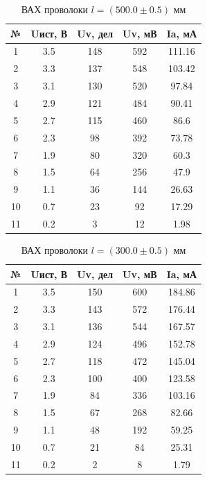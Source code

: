 \documentclass{article}
\begin{document}
	
	\begin{table}[H]
		\centering
		\begin{tabular}{|c|c|c|c|c|}
			\hline
			№ & Uист, В & Uv, дел & Uv, мВ & Ia, мА \\ \hline
			1 & 3.5 & 148 & 592 & 111.16 \\ \hline
			2 & 3.3 & 137 & 548 & 103.42 \\ \hline
			3 & 3.1 & 130 & 520 & 97.84 \\ \hline
			4 & 2.9 & 121 & 484 & 90.41 \\ \hline
			5 & 2.7 & 115 & 460 & 86.6 \\ \hline
			6 & 2.3 & 98 & 392 & 73.78 \\ \hline
			7 & 1.9 & 80 & 320 & 60.3 \\ \hline
			8 & 1.5 & 64 & 256 & 47.9 \\ \hline
			9 & 1.1 & 36 & 144 & 26.63 \\ \hline
			10 & 0.7 & 23 & 92 & 17.29 \\ \hline
			11 & 0.2 & 3 & 12 & 1.98 \\ \hline
		\end{tabular}
		\caption{ВАХ проволоки $l = (500.0 \pm 0.5)$ мм}
	\end{table}
	
	\begin{table}[H]
		\centering
		\begin{tabular}{|c|c|c|c|c|}
			\hline
			№ & Uист, В & Uv, дел & Uv, мВ & Ia, мА \\ \hline
			1 & 3.5 & 150 & 600 & 184.86 \\ \hline
			2 & 3.3 & 143 & 572 & 176.44 \\ \hline
			3 & 3.1 & 136 & 544 & 167.57 \\ \hline
			4 & 2.9 & 124 & 496 & 152.78 \\ \hline
			5 & 2.7 & 118 & 472 & 145.04 \\ \hline
			6 & 2.3 & 100 & 400 & 123.58 \\ \hline
			7 & 1.9 & 84 & 336 & 103.16 \\ \hline
			8 & 1.5 & 67 & 268 & 82.66 \\ \hline
			9 & 1.1 & 48 & 192 & 59.25 \\ \hline
			10 & 0.7 & 21 & 84 & 25.31 \\ \hline
			11 & 0.2 & 2 & 8 & 1.79 \\ \hline
		\end{tabular}
		\caption{ВАХ проволоки $l = (300.0 \pm 0.5)$ мм}
	\end{table}
	
\end{document}
